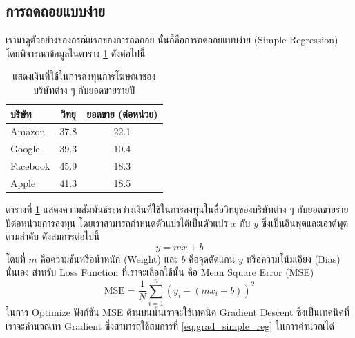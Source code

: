 \subsection{การถดถอยแบบง่าย}
\label{ssec:simple_lin_res}

เรามาดูตัวอย่างของกรณีแรกของการถดถอย นั่นก็คือการถดถอยแบบง่าย (Simple Regression) โดยพิจารณาข้อมูลในตาราง
\ref{tab:simple_reg_data} ดังต่อไปนี้
%
\begin{table}[H]
    \centering
    \caption{แสดงเงินที่ใช้ในการลงทุนการโฆษณาของบริษัทต่าง ๆ กับยอดขายรายปี}
    \label{tab:simple_reg_data}
    \begin{tabular}{lcc}
        \toprule
        \textbf{บริษัท} & \textbf{วิทยุ} & \textbf{ยอดขาย (ต่อหน่วย)} \\
        \midrule
        Amazon        & 37.8         & 22.1                     \\
        Google        & 39.3         & 10.4                     \\
        Facebook      & 45.9         & 18.3                     \\
        Apple         & 41.3         & 18.5                     \\
        \bottomrule
    \end{tabular}
\end{table}
%
ตารางที่ \ref{tab:simple_reg_data} แสดงความสัมพันธ์ระหว่างเงินที่ใช้ในการลงทุนในสื่อวิทยุของบริษัทต่าง ๆ กับยอดขายรายปีต่อหน่วยการลงทุน โดยเราสามารถกำหนดตัวแปรได้เป็นตัวแปร $x$ กับ $y$ ซึ่งเป็นอินพุตและเอาต์พุตตามลำดับ ดังสมการต่อไปนี้
%
\begin{equation}
    y = mx + b
\end{equation}
%
\noindent โดยที่ $m$ คือความชันหรือน้ำหนัก (Weight) และ $b$ คือจุดตัดแกน $y$ หรือความโน้มเอียง (Bias) นั่นเอง สำหรับ Loss
Function ที่เราจะเลือกใช้นั้น คือ Mean Square Error (MSE)
%
\begin{equation}
    \text{MSE} = \frac{1}{N} \sum_{i=1}^{n} (y_i - (m x_i + b))^2
\end{equation}
%
ในการ Optimize ฟังก์ชัน MSE ด้านบนนั้นเราจะใช้เทคนิค Gradient Descent ซึ่งเป็นเทคนิคที่เราจะคำนวณหา Gradient ซึ่งสามารถใช้สมการที่
\eqref{eq:grad_simple_reg} ในการคำนวณได้
%
